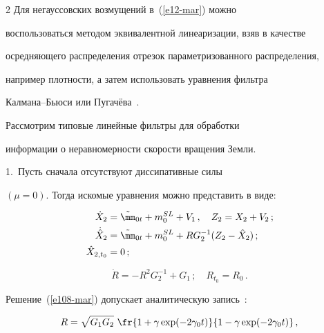 \begin{multicols}{2}
 Для негауссовских возмущений  в~(\ref{e12-mar}) можно


воспользоваться методом эквивалентной линеаризации, взяв в качестве


осредняющего распределения отрезок параметризованного распределения,


например  плотности, а затем использовать уравнения фильтра


Калмана--Бьюси или Пугачёва~\cite{19-mar, 20-mar}.





Рассмотрим типовые линейные фильтры для обработки 


информации о неравномерности скорости вращения Земли.





\smallskip





1.\ Пусть сначала отсутствуют диссипативные силы


 $(\mu =0)$. Тогда искомые уравнения можно представить в  виде:


\begin{align}


\dot X_2 &= \tilde\mm_{0t} + m_0^{SL} + V_1\,,\quad Z_2 = X_2 +


 V_2\,;\notag\\


\dot{\hat X}_2 &= \tilde\mm_{0t} + m_0^{SL} +R G_2^{-1} (Z_2 -\hat X_2)\,;\notag\\


\hat X_{2, t_0} &=0\,;\notag


\end{align}





\noindent


\begin{equation}


\dot R = - R^2 G_2^{-1} + G_1\,;\quad R_{t_0} = R_0\,.\label{e108-mar}


\end{equation}


Решение~(\ref{e108-mar}) допускает аналитическую запись~\cite{19-mar}:


\begin{equation*}


R= \sqrt{G_1G_2} \,\, \fr{1+\gamma \exp (-2\gamma_0 t)}{1 -\gamma \exp (-2\gamma_0 t)}\,,



\end{equation*}
\end{multicols}
